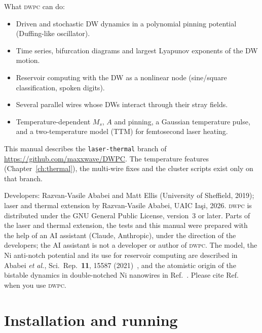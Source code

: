 \documentclass[11pt,a4paper]{report}
\newcommand{\dwpc}{\textsc{dwpc}}
\begin{document}
What \dwpc{} can do:
\begin{itemize}
\item Driven and stochastic DW dynamics in a polynomial pinning potential (Duffing-like oscillator).
\item Time series, bifurcation diagrams and largest Lyapunov exponents of the DW motion.
\item Reservoir computing with the DW as a nonlinear node (sine/square classification, spoken digits).
\item Several parallel wires whose DWs interact through their stray fields.
\item Temperature-dependent $M_s$, $A$ and pinning, a Gaussian temperature pulse, and a two-temperature model (TTM) for femtosecond laser heating.
\end{itemize}

This manual describes the \texttt{laser-thermal} branch of \url{https://github.com/maxxwave/DWPC}. The temperature features (Chapter~\ref{ch:thermal}), the multi-wire fixes and the cluster scripts exist only on that branch.

Developers: Razvan-Vasile Ababei and Matt Ellis (University of Sheffield, 2019); laser and thermal extension by Razvan-Vasile Ababei, UAIC Ia\c{s}i, 2026. \dwpc{} is distributed under the GNU General Public License, version~3 or later. Parts of the laser and thermal extension, the tests and this manual were prepared with the help of an AI assistant (Claude, Anthropic), under the direction of the developers; the AI assistant is not a developer or author of \dwpc{}. The model, the Ni anti-notch potential and its use for reservoir computing are described in Ababei \emph{et al.}, Sci.\ Rep.\ \textbf{11}, 15587 (2021)~\cite{ababei2021}, and the atomistic origin of the bistable dynamics in double-notched Ni nanowires in Ref.~\cite{ababei2026}. Please cite Ref.~\cite{ababei2021} when you use \dwpc.

\chapter{Installation and running}
\end{document}
